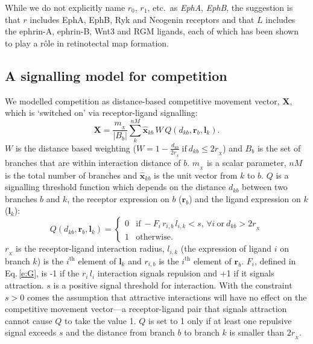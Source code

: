 \documentclass[11pt, a4paper]{article}
\begin{document}
While we do not explicitly name $r_0$, $r_1$, etc.~as \emph{EphA}, \emph{EphB}, the suggestion is that $r$ includes EphA, EphB, Ryk \citep{schmitt_wntryk_2006} and Neogenin \citep{rajagopalan_neogenin_2004} receptors and that $L$ includes the ephrin-A, ephrin-B, Wnt3 \citep{schmitt_wntryk_2006} and RGM \citep{monnier_rgm_2002} ligands, each of which has been shown to play a r\^ole in retinotectal map formation.

\subsection*{A signalling model for competition}

 We modelled competition as distance-based competitive movement vector, $\mathbf{X}$, which is `switched on' via receptor-ligand signalling:
%
\begin{equation}
\mathbf{X} = \frac{m_{\!_X}}{|B_{b}|} \sum_k^{nM} \hat{\mathbf{x}}_{kb}\,W\,Q(d_{kb}, \mathbf{r}_{b}, \mathbf{l}_{k}).
\end{equation}
%
$W$ is the distance based weighting ($W = 1-\frac{d_{kb}}{2r_{\!_X}}~\mathrm{if}~  d_{kb}\leq 2r_{\!_X}$) and $B_{b}$ is the set of branches that are within interaction distance of $b$. $m_{\!_X}$ is a scalar parameter, $nM$ is the total number of branches and $\hat{\mathbf{x}}_{kb}$ is the unit vector from $k$ to $b$.
%
$Q$ is a signalling threshold function which depends on the distance $d_{kb}$ between two branches $b$ and $k$, the receptor expression on $b$ ($\mathbf{r}_b$) and the ligand expression on $k$ ($\mathbf{l}_k$):
%
\begin{equation}
Q(d_{kb}, \mathbf{r}_{b}, \mathbf{l}_{k}) = \begin{cases}
                 0 & \mathrm{if}~-F_i\,r_{i,b}\,l_{i,k} <
                 s,\,\forall{i}~\mathrm{or}~d_{kb} > 2r_{\!_X} \\
                 1 & \mathrm{otherwise.}
     \end{cases}
\end{equation}
%
$r_{\!_X}$ is the receptor-ligand interaction radius, $l_{i,k}$ (the expression of ligand $i$ on branch $k$) is the $i^{\mathrm{th}}$ element of $\mathbf{l}_k$ and $r_{i,b}$ is the $i^{\mathrm{th}}$ element of $\mathbf{r}_b$.
$F_i$, defined in Eq.\,\ref{e:G}, is -1 if the $r_{i}\,l_{i}$ interaction signals repulsion and +1 if it signals attraction.
$s$ is a positive signal threshold for interaction.
With the constraint $s>0$ comes the assumption that attractive interactions will have no effect on the competitive movement vector---a receptor-ligand pair that signals attraction cannot cause $Q$ to take the value 1.
$Q$ is set to 1 only if at least one repulsive signal exceeds $s$ and the distance from branch $b$ to branch $k$ is smaller than $2 r_{\!_X}$.
\end{document}
